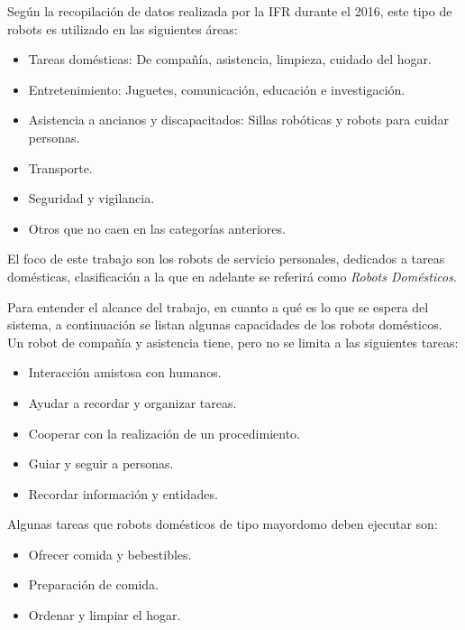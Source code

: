 Seg\'un la recopilaci\'on de datos realizada por la IFR durante el 2016, este tipo de robots es utilizado en las siguientes \'areas:
\begin{itemize}[topsep=0pt]
\setlength\itemsep{0.2em}
\item Tareas dom\'esticas: De compa\~n\'ia, asistencia, limpieza, cuidado del hogar.
\item Entretenimiento: Juguetes, comunicaci\'on, educaci\'on e investigaci\'on.
\item Asistencia a ancianos y discapacitados: Sillas rob\'oticas y robots para cuidar personas.
\item Transporte.
\item Seguridad y vigilancia.
\item Otros que no caen en las categor\'ias anteriores.
\end{itemize}
\bigskip

El foco de este trabajo son los robots de servicio personales, dedicados a tareas dom\'esticas, clasificaci\'on a la que en  adelante se referir\'a como \textit{Robots Dom\'esticos}.

Para entender el alcance del trabajo, en cuanto a qu\'e es lo que se espera del sistema, a continuaci\'on se listan algunas capacidades de los robots dom\'esticos. Un robot de compa\~n\'ia y asistencia tiene, pero no se limita a las siguientes tareas:
\begin{itemize}[topsep=0pt]
\setlength\itemsep{0.2em}
\item Interacci\'on amistosa con humanos.
\item Ayudar a recordar y organizar tareas.
\item Cooperar con la realizaci\'on de un procedimiento.
\item Guiar y seguir a personas.
\item Recordar informaci\'on y entidades.
\end{itemize}
\bigskip

Algunas tareas que robots dom\'esticos de tipo mayordomo deben ejecutar son:
\begin{itemize}[topsep=0pt]
\setlength\itemsep{0.2em}
\item Ofrecer comida y bebestibles.
\item Preparaci\'on de comida.
\item Ordenar y limpiar el hogar.
\end{itemize}
\bigskip


